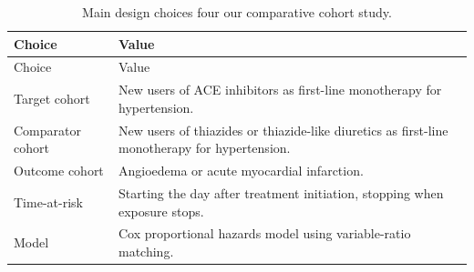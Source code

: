 \documentclass[11pt]{book}
\begin{document}
\begin{longtable}[]{@{}ll@{}}
\caption{\label{tab:aceChoices} Main design choices four our comparative
cohort study.}\tabularnewline
\toprule
\begin{minipage}[b]{0.23\columnwidth}\raggedright\strut
Choice\strut
\end{minipage} & \begin{minipage}[b]{0.71\columnwidth}\raggedright\strut
Value\strut
\end{minipage}\tabularnewline
\midrule
\endfirsthead
\toprule
\begin{minipage}[b]{0.23\columnwidth}\raggedright\strut
Choice\strut
\end{minipage} & \begin{minipage}[b]{0.71\columnwidth}\raggedright\strut
Value\strut
\end{minipage}\tabularnewline
\midrule
\endhead
\begin{minipage}[t]{0.23\columnwidth}\raggedright\strut
Target cohort\strut
\end{minipage} & \begin{minipage}[t]{0.71\columnwidth}\raggedright\strut
New users of ACE inhibitors as first-line monotherapy for
hypertension.\strut
\end{minipage}\tabularnewline
\begin{minipage}[t]{0.23\columnwidth}\raggedright\strut
Comparator cohort\strut
\end{minipage} & \begin{minipage}[t]{0.71\columnwidth}\raggedright\strut
New users of thiazides or thiazide-like diuretics as first-line
monotherapy for hypertension.\strut
\end{minipage}\tabularnewline
\begin{minipage}[t]{0.23\columnwidth}\raggedright\strut
Outcome cohort\strut
\end{minipage} & \begin{minipage}[t]{0.71\columnwidth}\raggedright\strut
Angioedema or acute myocardial infarction.\strut
\end{minipage}\tabularnewline
\begin{minipage}[t]{0.23\columnwidth}\raggedright\strut
Time-at-risk\strut
\end{minipage} & \begin{minipage}[t]{0.71\columnwidth}\raggedright\strut
Starting the day after treatment initiation, stopping when exposure
stops.\strut
\end{minipage}\tabularnewline
\begin{minipage}[t]{0.23\columnwidth}\raggedright\strut
Model\strut
\end{minipage} & \begin{minipage}[t]{0.71\columnwidth}\raggedright\strut
Cox proportional hazards model using variable-ratio matching.\strut
\end{minipage}\tabularnewline
\bottomrule
\end{longtable}
\end{document}

